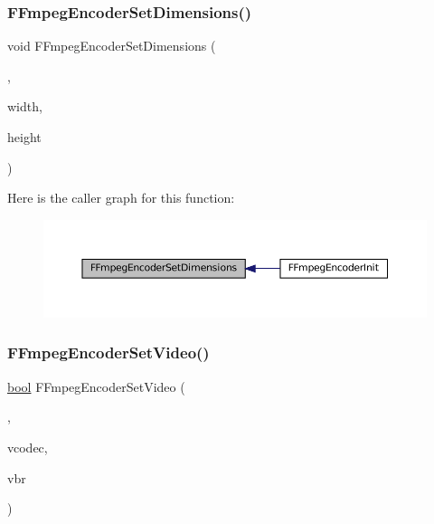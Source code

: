 \subsubsection{\texorpdfstring{F\+Fmpeg\+Encoder\+Set\+Dimensions()}{FFmpegEncoderSetDimensions()}}
{\footnotesize\ttfamily void F\+Fmpeg\+Encoder\+Set\+Dimensions (\begin{DoxyParamCaption}\item[{struct \mbox{\hyperlink{ffmpeg-encoder_8h_struct_f_fmpeg_encoder}{F\+Fmpeg\+Encoder}} $\ast$}]{,  }\item[{\mbox{\hyperlink{ioapi_8h_a787fa3cf048117ba7123753c1e74fcd6}{int}}}]{width,  }\item[{\mbox{\hyperlink{ioapi_8h_a787fa3cf048117ba7123753c1e74fcd6}{int}}}]{height }\end{DoxyParamCaption})}

Here is the caller graph for this function\+:
\nopagebreak
\begin{figure}[H]
\begin{center}
\leavevmode
\includegraphics[width=350pt]{ffmpeg-encoder_8h_acca84883ea3484ebd2b83a8378bc722b_icgraph}
\end{center}
\end{figure}
\mbox{\label{ffmpeg-encoder_8h_a917d76068b01c4cc7cccba88bc34afbe}} 
\subsubsection{\texorpdfstring{F\+Fmpeg\+Encoder\+Set\+Video()}{FFmpegEncoderSetVideo()}}
{\footnotesize\ttfamily \mbox{\hyperlink{libretro_8h_a4a26dcae73fb7e1528214a068aca317e}{bool}} F\+Fmpeg\+Encoder\+Set\+Video (\begin{DoxyParamCaption}\item[{struct \mbox{\hyperlink{ffmpeg-encoder_8h_struct_f_fmpeg_encoder}{F\+Fmpeg\+Encoder}} $\ast$}]{,  }\item[{const char $\ast$}]{vcodec,  }\item[{unsigned}]{vbr }\end{DoxyParamCaption})}

